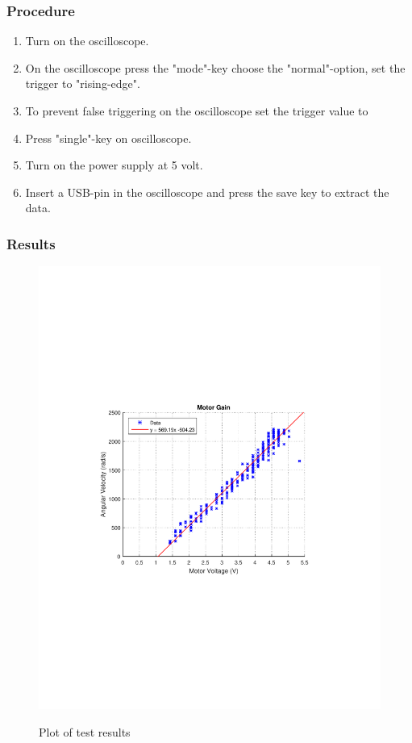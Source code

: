 \subsubsection{Procedure}

\begin{enumerate}
  \item Turn on the oscilloscope.
  \item On the oscilloscope press the "mode"-key choose the "normal"-option, set the trigger to "rising-edge".
  \item To prevent false triggering on the oscilloscope set the trigger value to %
  \item Press "single"-key on oscilloscope.
  \item Turn on the power supply at 5 volt.
  \item Insert a USB-pin in the oscilloscope and press the save key to extract the data.
\end{enumerate}

\subsubsection{Results}

\begin{figure}[H]
  \centering
  {
    \includegraphics[width=\textwidth]{figures/motorGain.pdf}
  }
	\caption{Plot of test results}
\end{figure}




